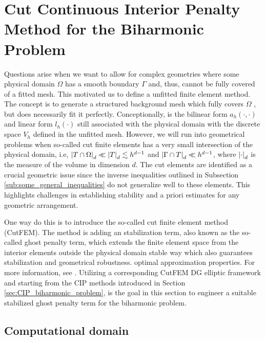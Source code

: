 \newpage
\section{Cut Continuous Interior Penalty Method for the Biharmonic Problem}%
\label{sec:cutcip_biharmonic_problem}


Questions arise when we want to allow for complex geometries where some physical domain $\Omega $ has a smooth boundary $\Gamma $ and, thus, cannot be fully covered of a fitted mesh. This motivated us to define a unfitted finite element method.
The concept is to generate a structured background mesh which fully covers $\Omega $ , but does necessarily fit it perfectly. Conceptionally, is the bilinear form $a_{h}( \cdot ,\cdot ) $  and linear form $l_{h}( \cdot ) $  still associated with the
physical domain with the discrete space $V_{h}$ defined in the unfitted mesh. However, we will run into geometrical problems when
so-called cut finite elements has a very small intersection of the physical domain, i.e, $\left\lvert  T \cap \Omega   \right\rvert_{d} \ll \left\lvert  T  \right\rvert_{d}  \lesssim h^{d-1}$ and $\left\lvert  \Gamma \cap T  \right\rvert_{d} \ll  h^{d-1}$, where $\left\lvert  \cdot   \right\rvert_{d} $ is the
measure of the volume in dimension $d$.
The cut elements are identified as a crucial geometric issue since the inverse inequalities outlined in Subsection \ref{sub:some_general_inequalities} do not generalize well to these elements. This highlights challenges in establishing stability and a priori estimates for any geometric arrangement.

One way do this is to introduce the so-called cut finite element method (CutFEM).
The method is adding an stabilization term, also known as the so-called ghost penalty term, which extends the finite element space from the interior elements outside the physical domain  stable way which also guarantees stabilization and geometrical robustness.
optimal approximation properties. For more information, see
\cite{burman2015cutfem, burman2010ghost, burman2022cutfem, burman2012fictitious}.
Utilizing a corresponding CutFEM DG elliptic framework \cite{gurkan2019stabilized} and starting from the CIP methods introduced in Section \ref{sec:CIP_biharmonic_problem}, is the goal in this section to engineer a suitable stabilized ghost penalty
term for the biharmonic problem.


\subsection{Computational domain}%
\label{sub:unfitted_mesh}

